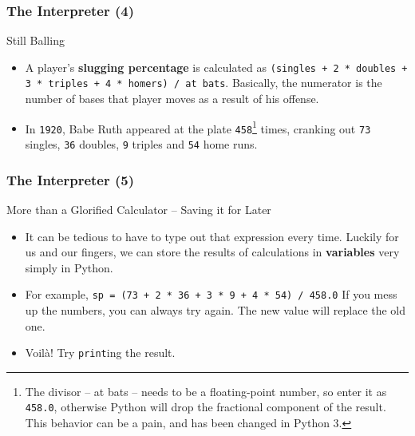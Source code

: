 \documentclass[10pt]{beamer}
\begin{document}
\begin{frame}
  \frametitle{The Interpreter (4)}
  \begin{block}{Still Balling}
    \begin{itemize}
      \item A player's \textbf{slugging percentage} is calculated as \texttt{(singles + 2 * doubles + 3 * triples + 4 * homers) / at bats}.
        Basically, the numerator is the number of bases that player moves as a result of his offense.
      \item In \texttt{1920}, Babe Ruth appeared at the plate \texttt{458}\footnote{The divisor -- at bats -- needs to be a floating-point number, so enter it as \texttt{458.0}, otherwise Python will drop the fractional component of the result.  This behavior can be a pain, and has been changed in Python 3.} times, cranking out \texttt{73} singles, \texttt{36} doubles, \texttt{9} triples and \texttt{54} home runs.    
    \end{itemize}
  \end{block}
\end{frame}

\begin{frame}
  \frametitle{The Interpreter (5)}
  \begin{block}{More than a Glorified Calculator -- Saving it for Later}
    \begin{itemize}
      \item It can be tedious to have to type out that expression every time.
        Luckily for us and our fingers, we can store the results of calculations in \textbf{variables} very simply in Python.
      \item For example, \texttt{sp = (73 + 2 * 36 + 3 * 9 + 4 * 54) / 458.0}
        If you mess up the numbers, you can always try again.
        The new value will replace the old one.
      \item Voil\`{a}! Try \texttt{print}ing the result.
    \end{itemize}
  \end{block}
\end{frame}
\end{document}

